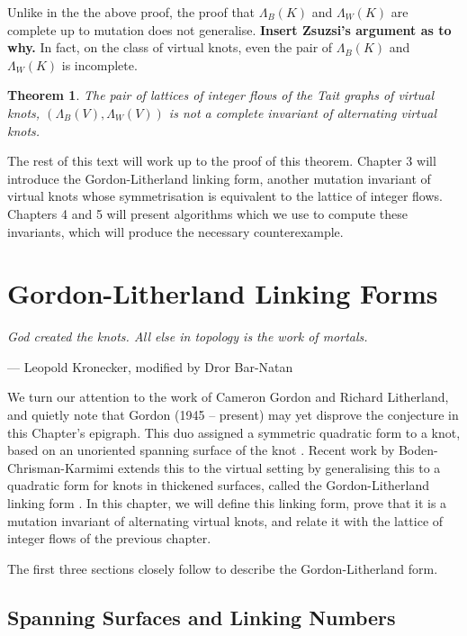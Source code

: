 \documentclass[12pt]{report}
\newcommand{\notered}[1]{{\color{Red} \textbf{#1}}}
\newtheorem*{theorem}{Theorem}
\begin{document}
Unlike in the the above proof, the proof that $\Lambda_{B}(K)$ and $\Lambda_{W}(K)$ are complete up to mutation does not generalise. \notered{Insert Zsuzsi's argument as to why.} In fact, on the class of virtual knots, even the pair of $\Lambda_{B}(K)$ and $\Lambda_{W}(K)$ is incomplete.

\begin{theorem}
The pair of lattices of integer flows of the Tait graphs of virtual knots, $(\Lambda_{B}(V), \Lambda_{W}(V))$ is not a complete invariant of alternating virtual knots.
\end{theorem}

The rest of this text will work up to the proof of this theorem. Chapter 3 will introduce the Gordon-Litherland linking form, another mutation invariant of virtual knots whose symmetrisation is equivalent to the lattice of integer flows. Chapters 4 and 5 will present algorithms which we use to compute these invariants, which will produce the necessary counterexample.


\chapter{Gordon-Litherland Linking Forms}

\epigraph{\itshape God created the knots. All else in topology is the work of mortals.}{--- Leopold Kronecker, modified by Dror Bar-Natan}

We turn our attention to the work of Cameron Gordon and Richard Litherland, and quietly note that Gordon (1945 -- present) may yet disprove the conjecture in this Chapter's epigraph. This duo assigned a symmetric quadratic form to a knot, based on an unoriented spanning surface of the knot \cite{signature-of-a-link}. Recent work by Boden-Chrisman-Karmimi extends this to the virtual setting by generalising this to a quadratic form for knots in thickened surfaces, called the Gordon-Litherland linking form \cite{gordon-litherland-pairing-thickened-surfaces}. In this chapter, we will define this linking form, prove that it is a mutation invariant of alternating virtual knots, and relate it with the lattice of integer flows of the previous chapter.

The first three sections closely follow \cite{gordon-litherland-pairing-thickened-surfaces, alternating-links-thickened-surfaces, mock-seifert-matrices} to describe the Gordon-Litherland form.

\section{Spanning Surfaces and Linking Numbers}
\end{document}
